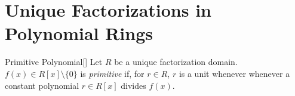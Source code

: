 \documentclass[../modern_algebra_2.tex]{subfiles}
\begin{document}
\section{Unique Factorizations in Polynomial Rings}

\begin{Definition}{Primitive Polynomial}[]
    Let \(R\) be a unique factorization domain.
    \(f(x) \in R[x] \setminus \{0\}\) is \emph{primitive} if,
    for \(r \in R\), \(r\) is a unit whenever
    whenever a constant polynomial \(r \in R[x]\) divides \(f(x)\).
\end{Definition}
\end{document}
